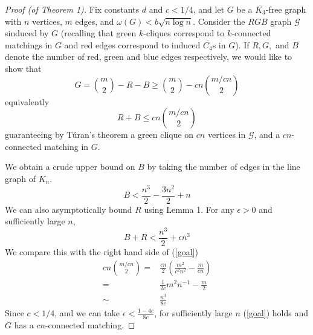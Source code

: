\documentclass{article}
\begin{document}
\begin{proof}[Proof (of Theorem 1)]
Fix constants $d$ and $c < 1/4$, and let $G$ be a $\overline{K_3}$-free graph with $n$ vertices, $m$ edges, and $\omega(G) < b\sqrt{n\log n}$.  Consider the $RGB$ graph $\mathcal{G}$ sinduced by $G$ (recalling that green $k$-cliques correspond to $k$-connected matchings in $G$ and red edges correspond to induced $\overline{C_4}$s in $G$).  If $R, G,$ and $B$ denote the number of red, green and blue edges respectively, we would like to show that \[G = {m\choose 2} - R - B \geq {m\choose 2} - cn{m/cn\choose 2}\] equivalently
\begin{equation}
	R + B \leq cn{m/cn\choose 2}\label{goal}
\end{equation}
guaranteeing by T\'{u}ran's theorem a green clique on $cn$ vertices in $\mathcal{G}$, and a $cn$-connected matching in $G$.

We obtain a crude upper bound on $B$ by taking the number of edges in the line graph of $K_n$.
\begin{equation}
	B < \frac{n^3}{2} - \frac{3n^2}{2} + n
\end{equation}
We can also asymptotically bound $R$ using Lemma 1.  For any $\epsilon > 0$ and sufficiently large $n$, \[B + R < \frac{n^3}{2} + \epsilon n^3\]
We compare this with the right hand side of (\ref{goal})
\begin{eqnarray}
	cn{m/cn\choose 2} =&\displaystyle \frac{cn}{2}\left(\frac{m^2}{c^2n^2} - \frac{m}{cn}\right)\\
	=& \displaystyle \frac{1}{2c}m^2n^{-1} - \frac{m}{2}\\
	\sim&   \displaystyle \frac{n^3}{8c}
\end{eqnarray}
Since $c < 1/4$, and we can take $\epsilon < \frac{1-4c}{8c}$, for sufficiently large $n$ (\ref{goal}) holds and $G$ has a $cn$-connected matching.
\end{proof}
\end{document}

